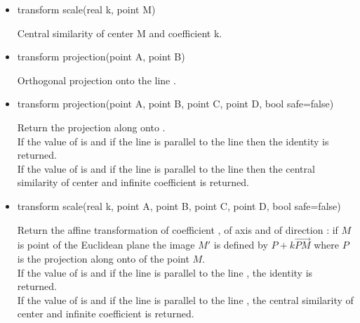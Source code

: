 \documentclass[pdftex]{article}
\begin{document}
\begin{itemize}
\item {}
  \begin{Vcolor}
    transform scale(real k, point M)
  \end{Vcolor}
  Central similarity of center M and coefficient k.
\item {}
  \begin{Vcolor}
    transform projection(point A, point B)
  \end{Vcolor}
  Orthogonal projection onto the line .
\item {}
  \begin{Vcolor}
    transform projection(point A, point B, point C, point D, bool safe=false)
  \end{Vcolor}
  Return the projection along    onto .\\
  If the value of  is  and if the line  
  is parallel to the line  then the identity is
  returned.\\
  If the value of  is  and  if the line  
  is parallel to the line  then the central similarity of
  center  and infinite coefficient is returned.
\item {}
  \begin{Vcolor}
    transform scale(real k, point A, point B, point C, point D, bool safe=false)
  \end{Vcolor}
  Return the affine transformation  of coefficient ,
  of axis  and of direction : if $M$ is point
  of the Euclidean plane the image $M'$ is defined by $P+k\vec{PM}$
  where $P$ is the projection along  onto  of
  the point $M$.\\
  If the value of  is  and if the
  line  is parallel to the line , the identity
  is returned.\\
  If the value of  is  and if the
  line  is parallel to the line , the central
  similarity of center  and infinite coefficient is returned.
\end{itemize}
\end{document}

